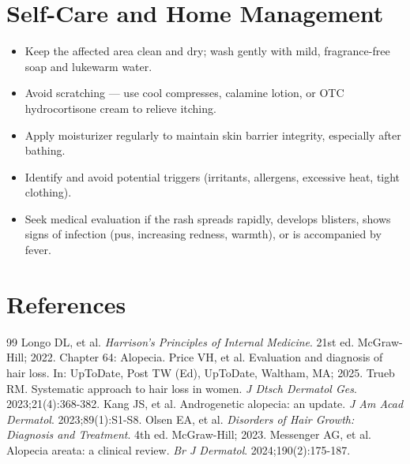 \section*{Self-Care and Home Management}
\begin{itemize}
  \item Keep the affected area clean and dry; wash gently with mild, fragrance-free soap and lukewarm water.
  \item Avoid scratching — use cool compresses, calamine lotion, or OTC hydrocortisone cream to relieve itching.
  \item Apply moisturizer regularly to maintain skin barrier integrity, especially after bathing.
  \item Identify and avoid potential triggers (irritants, allergens, excessive heat, tight clothing).
  \item Seek medical evaluation if the rash spreads rapidly, develops blisters, shows signs of infection (pus, increasing redness, warmth), or is accompanied by fever.
\end{itemize}

\section*{References}

\begin{thebibliography}{99}
 Longo DL, et al. \emph{Harrison's Principles of Internal Medicine}. 21st ed. McGraw-Hill; 2022. Chapter 64: Alopecia.
 Price VH, et al. Evaluation and diagnosis of hair loss. In: UpToDate, Post TW (Ed), UpToDate, Waltham, MA; 2025.
 Trueb RM. Systematic approach to hair loss in women. \emph{J Dtsch Dermatol Ges}. 2023;21(4):368-382.
 Kang JS, et al. Androgenetic alopecia: an update. \emph{J Am Acad Dermatol}. 2023;89(1):S1-S8.
 Olsen EA, et al. \emph{Disorders of Hair Growth: Diagnosis and Treatment}. 4th ed. McGraw-Hill; 2023.
 Messenger AG, et al. Alopecia areata: a clinical review. \emph{Br J Dermatol}. 2024;190(2):175-187.
\end{thebibliography}
